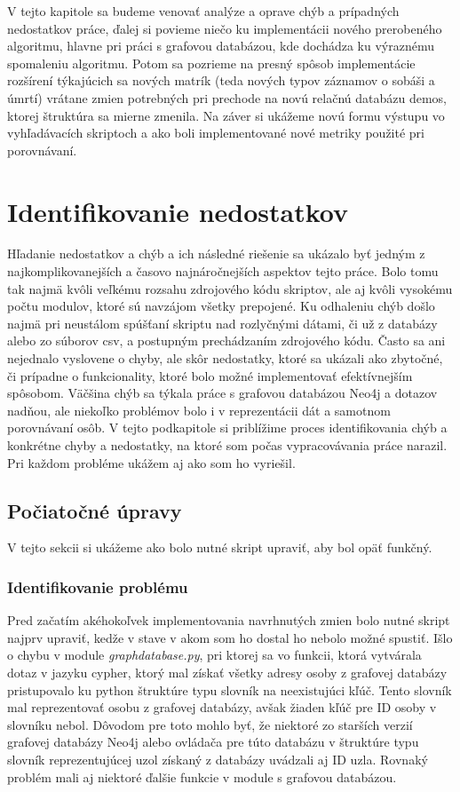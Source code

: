 V tejto kapitole sa budeme venovať analýze a oprave chýb a prípadných nedostatkov práce, ďalej si povieme niečo ku implementácii nového prerobeného algoritmu, hlavne pri práci s grafovou databázou, kde dochádza ku výraznému spomaleniu algoritmu. Potom sa pozrieme na presný spôsob implementácie rozšírení týkajúcich sa nových matrík (teda nových typov záznamov o sobáši a úmrtí) vrátane zmien potrebných pri prechode na novú relačnú databázu demos, ktorej štruktúra sa mierne zmenila. Na záver si ukážeme novú formu výstupu vo vyhľadávacích skriptoch a ako boli implementované nové metriky použité pri porovnávaní.

\section{Identifikovanie nedostatkov}

Hľadanie nedostatkov a chýb a ich následné riešenie sa ukázalo byť jedným z najkomplikovanejších a časovo najnáročnejších aspektov tejto práce. Bolo tomu tak najmä kvôli veľkému rozsahu zdrojového kódu skriptov, ale aj kvôli vysokému počtu modulov, ktoré sú navzájom všetky prepojené. Ku odhaleniu chýb došlo najmä pri neustálom spúšťaní skriptu nad rozlyčnými dátami, či už z databázy alebo zo súborov csv, a postupným prechádzaním zdrojového kódu. Často sa ani nejednalo vyslovene o chyby, ale skôr nedostatky, ktoré sa ukázali ako zbytočné, či prípadne o funkcionality, ktoré bolo možné implementovať efektívnejším spôsobom. Väčšina chýb sa týkala práce s grafovou databázou Neo4j a dotazov nadňou, ale niekoľko problémov bolo i v reprezentácii dát a samotnom porovnávaní osôb. V tejto podkapitole si priblížime proces identifikovania chýb a konkrétne chyby a nedostatky, na ktoré som počas vypracovávania práce narazil. Pri každom probléme ukážem aj ako som ho vyriešil.

\subsection{Počiatočné úpravy}

V tejto sekcii si ukážeme ako bolo nutné skript upraviť, aby bol opäť funkčný.

\subsubsection{Identifikovanie problému}

Pred začatím akéhokoľvek implementovania navrhnutých zmien bolo nutné skript najprv upraviť, kedže v stave v akom som ho dostal ho nebolo možné spustiť. Išlo o chybu v module \textit{graph\textunderscore database.py}, pri ktorej sa vo funkcii, ktorá vytvárala dotaz v jazyku cypher, ktorý mal získať všetky adresy osoby z grafovej databázy pristupovalo ku python štruktúre typu slovník na neexistujúci kľúč. Tento slovník mal reprezentovať osobu z grafovej databázy, avšak žiaden kľúč pre ID osoby v slovníku nebol. Dôvodom pre toto mohlo byť, že niektoré zo starších verzií grafovej databázy Neo4j alebo ovládača pre túto databázu v štruktúre typu slovník reprezentujúcej uzol získaný z databázy uvádzali aj ID uzla. Rovnaký problém mali aj niektoré ďalšie funkcie v module s grafovou databázou.


